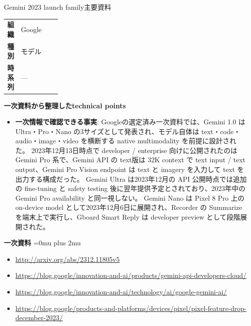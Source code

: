 \begin{technicalnote}{Gemini 2023 launch family}{主要資料}
\begingroup
\begin{tabularx}{\linewidth}{@{}>{\bfseries}p{0.22\linewidth}X@{}}
組織 & Google \\
種別 & モデル \\
時系列 & — \\
\end{tabularx}
\smallskip
{\bfseries 一次資料から整理したtechnical points}
\begin{itemize}[leftmargin=1.5em,itemsep=0.35em]
\item \textbf{一次情報で確認できる事実}: Googleの選定済み一次資料では、Gemini 1.0 は Ultra・Pro・Nano の3サイズとして発表され、モデル自体は text・code・audio・image・video を横断する native multimodality を前提に設計された。 2023年12月13日時点で developer / enterprise 向けに公開されたのは Gemini Pro 系で、Gemini API の text版は 32K context で text input / text output、Gemini Pro Vision endpoint は text と imagery を入力して text を出力する構成だった。 Gemini Ultra は2023年12月の API 公開時点では追加の fine-tuning と safety testing 後に翌年提供予定とされており、2023年中の Gemini Pro availability と同一視しない。 Gemini Nano は Pixel 8 Pro 上の on-device model として2023年12月6日に展開され、Recorder の Summarize を端末上で実行し、Gboard Smart Reply は developer preview として段階展開された。
\end{itemize}
\begin{minipage}{\linewidth}
\begin{samepage}
{\bfseries 一次資料}
\begingroup\sloppy
\Urlmuskip=0mu plus 2mu\relax
\begin{itemize}[leftmargin=1.5em,itemsep=0.25em]
\item {\scriptsize\url{http://arxiv.org/abs/2312.11805v5}}
\item {\scriptsize\url{https://blog.google/innovation-and-ai/products/gemini-api-developers-cloud/}}
\item {\scriptsize\url{https://blog.google/innovation-and-ai/technology/ai/google-gemini-ai/}}
\item {\scriptsize\url{https://blog.google/products-and-platforms/devices/pixel/pixel-feature-drop-december-2023/}}
\end{itemize}
\endgroup
\end{samepage}
\end{minipage}
\endgroup
\end{technicalnote}
\medskip

